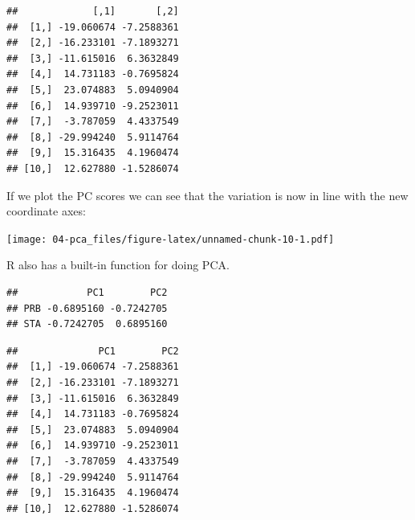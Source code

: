 \documentclass[]{book}
\newenvironment{Shaded}{\begin{snugshade}}{\end{snugshade}}
\newcommand{\CommentTok}[1]{\textcolor[rgb]{0.56,0.35,0.01}{\textit{#1}}}
\newcommand{\DecValTok}[1]{\textcolor[rgb]{0.00,0.00,0.81}{#1}}
\newcommand{\KeywordTok}[1]{\textcolor[rgb]{0.13,0.29,0.53}{\textbf{#1}}}
\newcommand{\NormalTok}[1]{#1}
\newcommand{\OperatorTok}[1]{\textcolor[rgb]{0.81,0.36,0.00}{\textbf{#1}}}
\newcommand{\StringTok}[1]{\textcolor[rgb]{0.31,0.60,0.02}{#1}}
\theoremstyle{definition}
\theoremstyle{definition}
\theoremstyle{definition}
\theoremstyle{remark}
\begin{document}
\begin{Shaded}
\end{Shaded}

\begin{verbatim}
##             [,1]       [,2]
##  [1,] -19.060674 -7.2588361
##  [2,] -16.233101 -7.1893271
##  [3,] -11.615016  6.3632849
##  [4,]  14.731183 -0.7695824
##  [5,]  23.074883  5.0940904
##  [6,]  14.939710 -9.2523011
##  [7,]  -3.787059  4.4337549
##  [8,] -29.994240  5.9114764
##  [9,]  15.316435  4.1960474
## [10,]  12.627880 -1.5286074
\end{verbatim}

If we plot the PC scores we can see that the variation is now in line with the new coordinate axes:

\texttt{[image: 04-pca\_files/figure-latex/unnamed-chunk-10-1.pdf]}

R also has a built-in function for doing PCA.

\begin{Shaded}
\end{Shaded}

\begin{verbatim}
##            PC1        PC2
## PRB -0.6895160 -0.7242705
## STA -0.7242705  0.6895160
\end{verbatim}

\begin{Shaded}
\end{Shaded}

\begin{verbatim}
##              PC1        PC2
##  [1,] -19.060674 -7.2588361
##  [2,] -16.233101 -7.1893271
##  [3,] -11.615016  6.3632849
##  [4,]  14.731183 -0.7695824
##  [5,]  23.074883  5.0940904
##  [6,]  14.939710 -9.2523011
##  [7,]  -3.787059  4.4337549
##  [8,] -29.994240  5.9114764
##  [9,]  15.316435  4.1960474
## [10,]  12.627880 -1.5286074
\end{verbatim}
\end{document}
